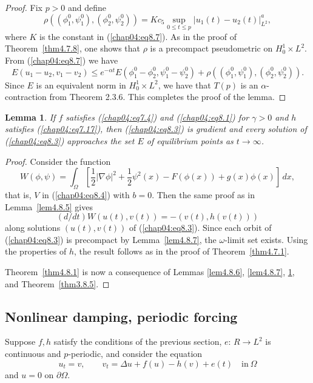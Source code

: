 \documentclass{surv-l}
\theoremstyle{plain}
\newtheorem{lemma}[theorem]{Lemma}
\theoremstyle{definition}
\numberwithin{equation}{section}
\numberwithin{figure}{chapter}
\begin{document}
\begin{proof}
Fix $p>0$ and define
\begin{equation*}
\rho((\phi_{1}^{0}, \psi_{1}^{0}), (\phi_{2}^{0}, \psi_{2}^{0}))=Kc_{5}\sup_{0\leq t\leq p}|u_{1}(t)-u_{2}(t)|_{L^{2}}^{a},
\end{equation*}
where $K$ is the constant in (\ref{chap04:eq8.7}). As in the proof of Theorem~\ref{thm4.7.8}, one shows that $\rho$ is a precompact pseudometric on $H_{0}^{1}\times L^{2}$. From (\ref{chap04:eq8.7}) we have
\begin{equation*}
E(u_{1}-u_{2}, v_{1}-v_{2})\leq e^{-\alpha t}E(\phi_{1}^{0}-\phi_{2}^{0}, \psi_{1}^{0}-\psi_{2}^{0})+\rho((\phi_{1}^{0}, \psi_{1}^{0}),(\phi_{2}^{0}, \psi_{2}^{0})).
\end{equation*}
Since $E$ is an equivalent norm in $H_{0}^{1}\times L^{2}$, we have that $T(p)$ is an $\alpha$-contraction from Theorem 2.3.6. This completes the proof of the lemma.
\end{proof}

\begin{lemma}\label{lem4.8.8} If $f$ satisfies \emph{(\ref{chap04:eq7.4})} and \emph{(\ref{chap04:eq8.1})} for $\gamma>0$ and $h$ satisfies \emph{(\ref{chap04:eq7.17})}, then \emph{(\ref{chap04:eq8.3})} is gradient and every solution of \emph{(\ref{chap04:eq8.3})} approaches the set $E$ of equilibrium points as $ t\rightarrow\infty$.
\end{lemma}

\begin{proof} Consider the function
\begin{equation*}
W(\phi, \psi)=\int_{\Omega}\left[\frac{1}{2}|\nabla\phi|^{2}+\frac{1}{2}\psi^{2}(x)-F(\phi(x))+g(x)\phi(x)\right]\, dx,
\end{equation*}
that is, $V$ in (\ref{chap04:eq8.4}) with $b=0$. Then the same proof as in Lemma~\ref{lem4.8.5} gives
\begin{equation*}
(d/dt)W(u(t), v(t))=-(v(t), h(v(t)))
\end{equation*}
along solutions $(u(t), v(t))$ of (\ref{chap04:eq8.3}). Since each orbit of (\ref{chap04:eq8.3}) is precompact by Lemma~\ref{lem4.8.7}, the $\omega$-limit set exists. Using the properties of $h$, the result follows as in the proof of Theorem~\ref{thm4.7.1}.

Theorem~\ref{thm4.8.1} is now a consequence of Lemmas \ref{lem4.8.6}, \ref{lem4.8.7}, \ref{lem4.8.8}, and Theorem~\ref{thm3.8.5}.
\end{proof}

\subsection{Nonlinear damping, periodic forcing}\label{subsec4.8.2}  Suppose $f, h$ satisfy the conditions of the previous section, $e{:}\,R\rightarrow L^{2}$ is continuous and $p$-periodic, and consider the equation
\begin{equation}\label{chap04:eq8.10}
u_{t}=v,\quad\quad v_{t}=\Delta u+f(u)-h(v)+e(t)\quad \mathrm{in}\ \Omega
\end{equation}
and $u=0$ on $\partial\Omega$.
\end{document}

